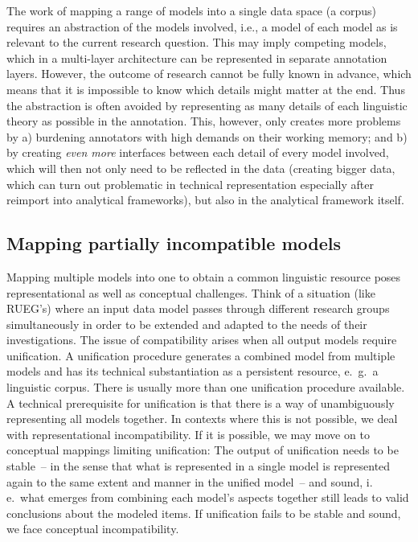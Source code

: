 \documentclass[output=paper,colorlinks,citecolor=brown]{langscibook}
\begin{document}
The work of mapping a range of models into a single data space (a corpus) requires an abstraction of the models involved, i.e., a model of each model as is relevant to the current research question. This may imply competing models, which in a multi-layer architecture can be represented in separate annotation layers. However, the outcome of research cannot be fully known in advance, which means that it is impossible to know which details might matter at the end. Thus the abstraction is often avoided by representing as many details of each linguistic theory as possible in the annotation. This, however, only creates more problems by a) burdening annotators with high demands on their working memory; and b) by creating \textit{even more} interfaces between each detail of every model involved, which will then not only need to be reflected in the data (creating bigger data, which can turn out problematic in technical representation especially after reimport into analytical frameworks), but also in the analytical framework itself. 

\subsection{Mapping partially incompatible models}
\label{sec:shadrovaetal:compatibility}

\begin{sloppypar}
Mapping multiple models into one to obtain a common linguistic resource poses representational as well as conceptual challenges.
Think of a situation (like RUEG's) where an input data model passes through different research groups simultaneously in order to be extended and adapted to the needs of their investigations. The issue of compatibility arises when all output models require unification.
A unification procedure generates a combined model from multiple models and has its technical substantiation as a persistent resource, e.~g.\ a linguistic corpus.
There is usually more than one unification procedure available.
A technical prerequisite for unification is that there is a way of unambiguously representing all models together.
In contexts where this is not possible, we deal with representational incompatibility.
If it is possible, we may move on to conceptual mappings limiting unification:
The output of unification needs to be stable~-- in the sense that what is represented in a single model is represented again to the same extent and manner in the unified model~-- and sound, i.\,e.\ what emerges from combining each model's aspects together still leads to valid conclusions about the modeled items.
If unification fails to be stable and sound, we face conceptual incompatibility.
\end{sloppypar}
\end{document}
